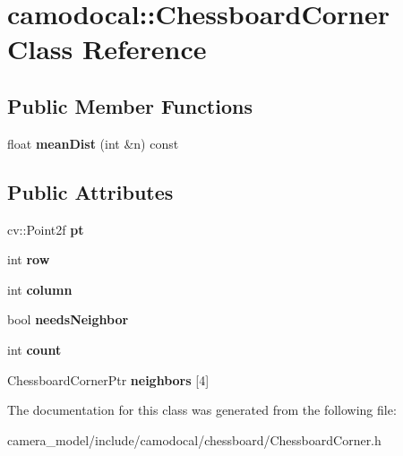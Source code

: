 \hypertarget{classcamodocal_1_1ChessboardCorner}{}\section{camodocal\+:\+:Chessboard\+Corner Class Reference}
\label{classcamodocal_1_1ChessboardCorner}
\subsection*{Public Member Functions}
\begin{DoxyCompactItemize}
\item 
\mbox{\label{classcamodocal_1_1ChessboardCorner_ad0f97fd79d023038737d6922d79a0dc1}} 
float {\bfseries mean\+Dist} (int \&n) const
\end{DoxyCompactItemize}
\subsection*{Public Attributes}
\begin{DoxyCompactItemize}
\item 
\mbox{\label{classcamodocal_1_1ChessboardCorner_ace70f702045e28b91d579000d33d9cc6}} 
cv\+::\+Point2f {\bfseries pt}
\item 
\mbox{\label{classcamodocal_1_1ChessboardCorner_ae07b0b6c9259e801201bf1c335c62e26}} 
int {\bfseries row}
\item 
\mbox{\label{classcamodocal_1_1ChessboardCorner_af0e21c0c1d5c63a7e53a0d77028a907d}} 
int {\bfseries column}
\item 
\mbox{\label{classcamodocal_1_1ChessboardCorner_a37896d01a5e3dac13ec68acc83b55d8e}} 
bool {\bfseries needs\+Neighbor}
\item 
\mbox{\label{classcamodocal_1_1ChessboardCorner_a45b6cb99f887343dc5db9e7844460c78}} 
int {\bfseries count}
\item 
\mbox{\label{classcamodocal_1_1ChessboardCorner_ab8f8803979b0198d0ea222110a75dee8}} 
Chessboard\+Corner\+Ptr {\bfseries neighbors} \mbox{[}4\mbox{]}
\end{DoxyCompactItemize}


The documentation for this class was generated from the following file\+:\begin{DoxyCompactItemize}
\item 
camera\+\_\+model/include/camodocal/chessboard/Chessboard\+Corner.\+h\end{DoxyCompactItemize}
